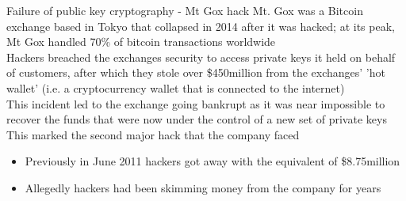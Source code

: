 \documentclass[11pt]{beamer}
\begin{document}




\begin{frame}{Failure of public key cryptography - Mt Gox hack}
	Mt. Gox was a Bitcoin exchange based in Tokyo that collapsed in 2014 after it was hacked; at its peak, Mt Gox handled 70\% of bitcoin transactions worldwide \\ \vspace{2mm}
	Hackers breached the exchanges security to access private keys it held on behalf of customers, after which they stole over \$450million from the exchanges' 'hot wallet' (i.e. a cryptocurrency wallet that is connected to the internet)\\ \vspace{2mm}
	This incident led to the exchange going bankrupt as it was near impossible to recover the funds that were now under the control of a new set of private keys \\ \vspace{2mm}
	This marked the second major hack that the company faced
	\begin{itemize}
		\item Previously in June 2011 hackers got away with the equivalent of \$8.75million
		\item Allegedly hackers had been skimming money from the company for years
	\end{itemize}
\end{frame}
\end{document}
